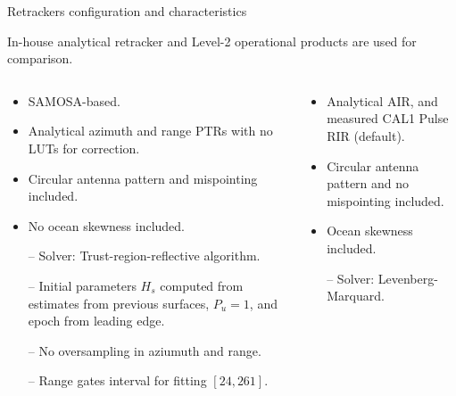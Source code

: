\documentclass[compress,8pt]{beamer}
\begin{document}
\begin{frame}{Retrackers configuration and characteristics}

In-house analytical retracker and Level-2 operational products are used for comparison.

\medskip
\begin{columns}
\begin{column}{0.5\textwidth}


\begin{itemize}
    \item SAMOSA-based.

    \item Analytical azimuth and range PTRs with no LUTs for correction.

    \item Circular antenna pattern and mispointing included.

    \item No ocean skewness included. %

    \item[--] Solver: Trust-region-reflective algorithm.
    
    \item[--] Initial parameters $H_s$ computed from estimates from previous surfaces, $P_u=1$, and epoch from leading edge.

    \item[--] No oversampling in aziumuth and range.

    \item[--] Range gates interval for fitting $[24, 261]$. %

 \end{itemize}

\end{column}
\begin{column}{0.5\textwidth}


\bigskip
\begin{itemize} 
    \item Analytical AIR, and measured CAL1 Pulse RIR (default).

    \item Circular antenna pattern and no mispointing included.

    \item Ocean skewness included. %

    \item[--] Solver: Levenberg-Marquard.


\end{itemize}
\end{column}
\end{columns}
\end{frame}
\end{document}
